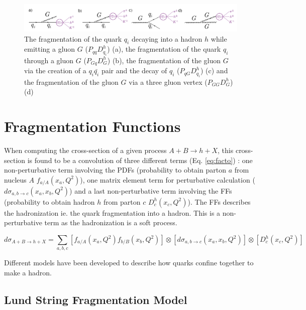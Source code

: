 \begin{figure}[!h]
  \centering
	\includegraphics[scale=0.45]{./gfx/QuarkFrag.png}
	\caption{The fragmentation of the quark $q_i$ decaying into a hadron $h$ while emitting a gluon $G$ ($P_{qq}D^h_{q_{i}}$) (a), the fragmentation of the quark $q_i$ through a gluon $G$ ($P_{Gq}D^h_{G}$) (b), the fragmentation of the gluon $G$ via the creation of a $q_i \bar{q_i}$ pair and the decay of $q_i$ ($P_{qG}D^h_{q_{i}}$) (c) and the fragmentation of the gluon $G$ via a three gluon vertex ($P_{GG}D^h_{G}$) (d)}
	\label{pic:QuarkFrag}
\end{figure}


\section{Fragmentation Functions}\label{sec:FF}

When computing the cross-section of a given process $A+B \rightarrow h+X$, this cross-section is found to be a convolution of three different terms (Eq. \ref{eq:facto}) : one non-perturbative term involving the PDFs (probability to obtain parton $a$ from nucleus $A$ $f_{a/A}(x_a,Q^2)$), one matrix element term for perturbative calculation ($d\sigma_{a,b \rightarrow c}(x_a,x_b,Q^2)$) and a last non-perturbative term involving the FFs (probability to obtain hadron $h$ from parton $c$ $D^h_c(x_c,Q^2)$). The FFs describes the hadronization ie. the quark fragmentation into a hadron. This is a non-perturbative term as the hadronization is a soft process.

\begin{equation}
  d\sigma_{A+B \rightarrow h+X} = \sum_{a,b,c} \left[ f_{a/A}(x_a,Q^2) f_{b/B}(x_b,Q^2) \right] \otimes \left[ d\sigma_{a,b \rightarrow c}(x_a,x_b,Q^2) \right] \otimes \left[ D^h_c(x_c,Q^2) \right]
  \label{eq:facto}
\end{equation}

Different models have been developed to describe how quarks confine together to make a hadron.

\subsection{Lund String Fragmentation Model}

